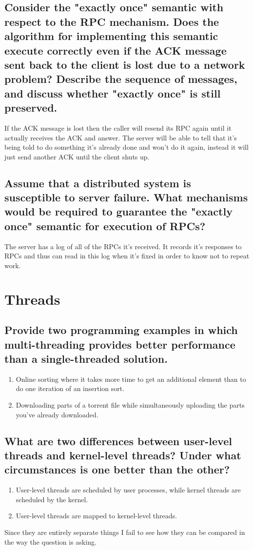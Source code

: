 \documentclass{book}%
\begin{document}
\section{Consider the "exactly once" semantic with respect to the RPC mechanism.
Does the algorithm for implementing this semantic execute correctly even if the
ACK message sent back to the client is lost due to a network problem? Describe
the sequence of messages, and discuss whether "exactly once" is still 
preserved.} 
If the ACK message is lost then the caller will resend its RPC again until it 
actually receives the ACK and answer. The server will be able to tell that it's
being told to do something it's already done and won't do it again, instead it
will just send another ACK until the client shuts up.
\section{Assume that a distributed system is susceptible to server failure. What
mechanisms would be required to guarantee the "exactly once" semantic for 
execution of RPCs?}
The server has a log of all of the RPCs it's received. It records it's responses
to RPCs and thus can read in this log when it's fixed in order to know not to
repeat work.
\chapter{Threads}
\section{Provide two programming examples in which multi-threading provides
better performance than a single-threaded solution.}
\begin{enumerate}
\item Online sorting where it takes more time to get an additional element than
to do one iteration of an insertion sort.
\item Downloading parts of a torrent file while simultaneously uploading the 
parts you've already downloaded.
\end{enumerate}
\section{What are two differences between user-level threads and kernel-level 
threads? Under what circumstances is one better than the other?}
\begin{enumerate}
\item User-level threads are scheduled by user processes, while kernel threads 
are scheduled by the kernel.
\item User-level threads are mapped to kernel-level threads.
\end{enumerate}
Since they are entirely separate things I fail to see how they can be compared 
in the way the question is asking.
\end{document}

